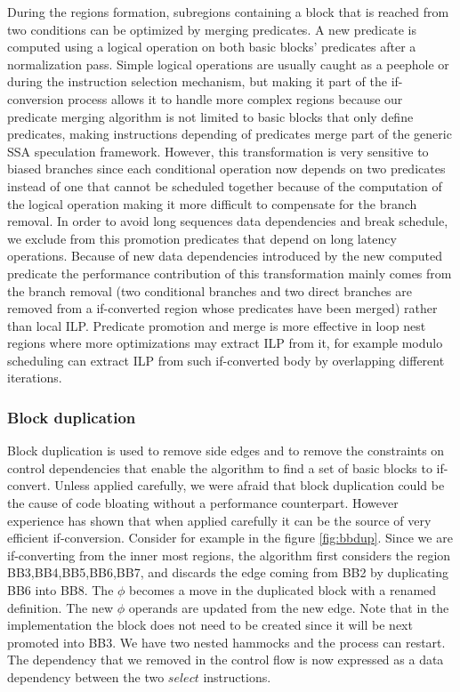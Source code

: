 During the regions formation, subregions containing a block that is reached from two conditions can be optimized by merging predicates. A new predicate is computed using a logical operation on both basic blocks' predicates after a normalization pass. Simple logical operations are usually caught as a peephole or during the instruction selection mechanism, but making it part of the if-conversion process allows it to handle more complex regions because our predicate merging algorithm is not limited to basic blocks that only define predicates, making instructions depending of predicates merge part of the generic SSA speculation framework. However, this transformation is very sensitive to biased branches since each conditional operation now depends on two predicates instead of one that cannot be scheduled together because of the computation of the logical operation making it more difficult to compensate for the branch removal. In order to avoid long sequences data dependencies and break schedule, we exclude from this promotion predicates that depend on long latency operations.
Because of new data dependencies introduced by the new computed predicate the performance contribution of this transformation mainly comes from the branch removal (two conditional branches and two direct branches are removed from a if-converted region whose predicates have been merged) rather than local ILP. Predicate promotion and merge is more effective in loop nest regions where more optimizations may extract ILP from it, for example modulo scheduling can extract ILP from such if-converted body by overlapping different iterations. 

\subsubsection{Block duplication}

Block duplication is used to remove side edges and to remove the constraints on control dependencies that enable the algorithm to find a set of basic blocks to if-convert. Unless applied carefully, we were afraid that block duplication could be the cause of code bloating without a performance counterpart. However experience has shown that when applied carefully it can be the source of very efficient if-conversion. Consider for example in the figure \ref{fig:bbdup}. Since we are if-converting from the inner most regions, the algorithm first considers the region {BB3,BB4,BB5,BB6,BB7}, and discards the edge coming from BB2 by duplicating BB6 into BB8. The $\phi$ becomes a move in the duplicated block with a renamed definition. The new $\phi$ operands are updated from the new edge. Note that in the implementation the block does not need to be created since it will be next promoted into BB3. We have two nested hammocks and the process can restart. The dependency that we removed in the control flow is now expressed as a data dependency between the two $select$ instructions.


